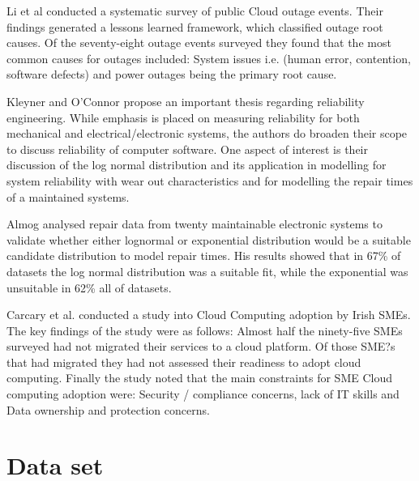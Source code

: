 \documentclass[conference]{IEEEtran}
\begin{document}
Li et al \cite{li2013cloud} conducted a systematic survey of public Cloud outage events. Their findings generated a lessons learned framework, which classified outage root causes. Of the seventy-eight outage events surveyed they found that the most common causes for outages included: System issues i.e. (human error, contention, software defects) and power outages being the primary root cause. \par

Kleyner and O'Connor \cite{o2011practical} propose an important thesis regarding reliability engineering. While emphasis is placed on measuring reliability for both mechanical and electrical/electronic systems, the authors do broaden their scope to discuss reliability of computer software. One aspect of interest is their discussion of the log normal distribution and its application in modelling for system reliability with wear out characteristics and for modelling the repair times of a maintained systems. \par

Almog \cite{almog1979study} analysed repair data from twenty maintainable electronic systems to validate whether either lognormal or exponential distribution would be a suitable candidate distribution to model repair times. His results showed that in 67\% of datasets the log normal distribution was a suitable fit, while the exponential was unsuitable in 62\% all of datasets. \par

Carcary et al. \cite{carcary2014adoption} conducted a study into Cloud Computing adoption by Irish SMEs. The key findings of the study were as follows: Almost half the ninety-five SMEs surveyed had not migrated their services to a cloud platform. Of those SME?s that had migrated they had not assessed their readiness to adopt cloud computing. Finally the study noted that the main constraints for SME Cloud computing adoption were: Security / compliance concerns, lack of IT skills and Data ownership and protection concerns. \par
\section{Data set}
\end{document}
